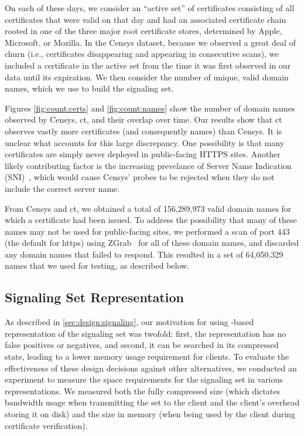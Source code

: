 On each of these days, we consider an ``active set'' of certificates consisting
of all certificates that were valid on that day and had an associated
certificate chain rooted in one of the three major root certificate stores,
determined by Apple, Microsoft, or Mozilla. In the Censys dataset, because we
observed a great deal of churn (i.e., certificates disappearing and appearing in
consecutive scans), we included a certificate in the active set from the
time it was first observed in our data until its expiration. We then consider
the number of unique, valid domain names, which we use to build the signaling
set.

Figures \autoref{fig:count:certs} and \autoref{fig:count:names} show the number
of domain names observed by Censys, \ac{ct}, and their overlap over time. Our
results show that \ac{ct} observes vastly more certificates (and consequently
names) than Censys. It is unclear what accounts for this large discrepancy. One
possibility is that many certificates are simply never deployed in public-facing
HTTPS sites. Another likely contributing factor is the increasing prevelance of
Server Name Indication (SNI)~\cite{rfc6066}, which would cause Censys' probes to
be rejected when they do not include the correct server name.

From Censys and \ac{ct}, we obtained a total of 156,289,973 valid domain names
for which a certificate had been issued. To address the possibility that many of
these names may not be used for public-facing sites, we performed a scan of port
443 (the default for \ac{https}) using ZGrab~\cite{durumeric2015search} for all
of these domain names, and discarded any domain names that failed to respond.
This resulted in a set of 64,050,329 names that we used for testing, as
described below.

\subsection{Signaling Set Representation}
\label{sec:evaluation:implementation}

As described in \autoref{sec:design:signaling}, our motivation for using
-based representation of the signaling set was twofold: first, the
representation has no false positives or negatives, and second, it can be
searched in its compressed state, leading to a lower memory usage requirement
for clients. To evaluate the effectiveness of these design decisions against
other alternatives, we conducted an experiment to measure the space requirements
for the signaling set in various representations. We measured both the fully
compressed size (which dictates bandwidth usage when transmitting the set to the
client and the client's overhead storing it on disk) and the size in memory
(when being used by the client during certificate verification).

